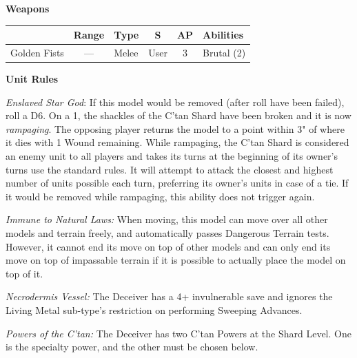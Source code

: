 \begin{minipage}[t]{0.72\textwidth}
	\vspace*{2em}
	\textbf{Weapons}
	
	\begin{tabular}{L{90 pt} c C{40pt} *{2}{c} >{\raggedright\arraybackslash}p{130pt}}
		& Range & Type & S & AP & Abilities \\
		\hline
		Golden Fists & — & Melee & User & 3 & Brutal (2) \\
	\end{tabular}
	
	\vspace*{2em}
	\textbf{Unit Rules}
	
	\textit{Enslaved Star God}: If this model would be removed (after  roll have been failed), roll a D6. On a 1, the shackles of the C'tan Shard have been broken and it is now \textit{rampaging}. The opposing player returns the model to a point within 3" of where it dies with 1 Wound remaining. While rampaging, the C'tan Shard is considered an enemy unit to all players and takes its turns at the beginning of its owner's turns use the standard rules. It will attempt to attack the closest and highest number of units possible each turn, preferring its owner's units in case of a tie. If it would be removed while rampaging, this ability does not trigger again.
	
	\textit{Immune to Natural Laws:} When moving, this model can move over all other models and terrain freely, and automatically passes Dangerous Terrain tests. However, it cannot end its move on top of other models and can only end its move on top of impassable terrain if it is possible to actually place the model on top of it.
		
	\textit{Necrodermis Vessel:} The Deceiver has a 4+ invulnerable save and ignores the Living Metal sub-type's restriction on performing Sweeping Advances.
	
	\textit{Powers of the C'tan:} The Deceiver has two C'tan Powers at the Shard Level. One is the  specialty power, and the other must be chosen below.
	

\end{minipage}

